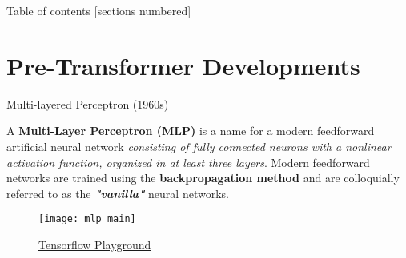 \documentclass[10pt]{beamer}
\begin{document}
\begin{frame}{Table of contents}
	[sections numbered]
	\tableofcontents%
\end{frame}

\section[Pre-Transformer Developments]{Pre-Transformer Developments}

\begin{frame}[fragile]{ Multi-layered Perceptron (1960s)}

	A \textbf{Multi-Layer Perceptron (MLP)} is a name for a modern feedforward artificial neural network
	\textit{consisting of fully connected neurons with a nonlinear activation function, organized in at least three
		layers}. Modern feedforward networks are trained using the \textbf{backpropagation method} and are
	colloquially referred to as the \textit{\textbf{"vanilla"}} neural networks.

	\begin{figure}[h]
		\centering
		\texttt{[image: mlp\_main]}
		\caption{
			\href{https://playground.tensorflow.org/}{Tensorflow Playground}
		}
	\end{figure}

\end{frame}
\end{document}
